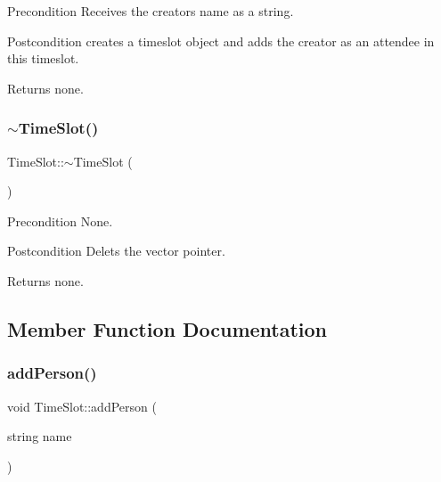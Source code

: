 \begin{DoxyPrecond}{Precondition}
Receives the creator\textquotesingle{}s name as a string. 
\end{DoxyPrecond}
\begin{DoxyPostcond}{Postcondition}
creates a timeslot object and adds the creator as an attendee in this timeslot. 
\end{DoxyPostcond}
\begin{DoxyReturn}{Returns}
none. 
\end{DoxyReturn}
\mbox{\label{class_time_slot_abd88f944c5d276ec0f94153095eb16d1}} 
\subsubsection{\texorpdfstring{$\sim$\+Time\+Slot()}{~TimeSlot()}}
{\footnotesize\ttfamily Time\+Slot\+::$\sim$\+Time\+Slot (\begin{DoxyParamCaption}{ }\end{DoxyParamCaption})}

\begin{DoxyPrecond}{Precondition}
None. 
\end{DoxyPrecond}
\begin{DoxyPostcond}{Postcondition}
Delets the vector pointer. 
\end{DoxyPostcond}
\begin{DoxyReturn}{Returns}
none. 
\end{DoxyReturn}


\subsection{Member Function Documentation}
\mbox{\label{class_time_slot_afdce07b2639b2f3b451ccdbb83c36291}} 
\subsubsection{\texorpdfstring{add\+Person()}{addPerson()}}
{\footnotesize\ttfamily void Time\+Slot\+::add\+Person (\begin{DoxyParamCaption}\item[{string}]{name }\end{DoxyParamCaption})}

